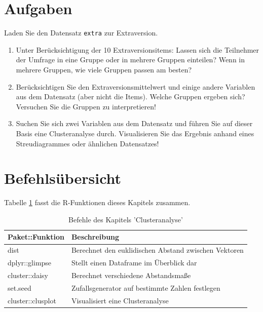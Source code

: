\documentclass[12pt,ngerman,]{book}
\theoremstyle{definition}
\theoremstyle{definition}
\theoremstyle{remark}
\begin{document}
\section{Aufgaben}\label{aufgaben-11}

Laden Sie den Datensatz \texttt{extra} zur Extraversion.

\begin{enumerate}
\def\labelenumi{\arabic{enumi}.}
\item
  Unter Berücksichtigung der 10 Extraversionsitems: Lassen sich die
  Teilnehmer der Umfrage in eine Gruppe oder in mehrere Gruppen
  einteilen? Wenn in mehrere Gruppen, wie viele Gruppen passen am
  besten?
\item
  Berücksichtigen Sie den Extraversionsmittelwert und einige andere
  Variablen aus dem Datensatz (aber nicht die Items). Welche Gruppen
  ergeben sich? Versuchen Sie die Gruppen zu interpretieren!
\item
  Suchen Sie sich zwei Variablen aus dem Datensatz und führen Sie auf
  dieser Basis eine Clusteranalyse durch. Visualisieren Sie das Ergebnis
  anhand eines Streudiagrammes oder ähnlichen Datensatzes!
\end{enumerate}

\section{Befehlsübersicht}\label{befehlsubersicht-9}

Tabelle \ref{tab:befehle-cluster} fasst die R-Funktionen dieses Kapitels
zusammen.

\begin{table}

\caption{\label{tab:befehle-cluster}Befehle des Kapitels 'Clusteranalyse'}
\centering
\begin{tabular}[t]{l|l}
\hline
Paket::Funktion & Beschreibung\\
\hline
dist & Berechnet den euklidischen Abstand zwischen Vektoren\\
\hline
dplyr::glimpse & Stellt einen Dataframe im Überblick dar\\
\hline
cluster::daisy & Berechnet verschiedene Abstandsmaße\\
\hline
set.seed & Zufallsgenerator auf bestimmte Zahlen festlegen\\
\hline
cluster::clusplot & Visualisiert eine Clusteranalyse\\
\hline
\end{tabular}
\end{table}
\end{document}
